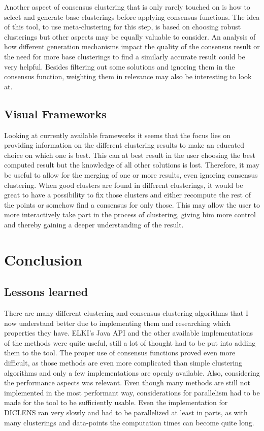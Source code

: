 \documentclass[
	a4paper,
	english,
	twoside,
	openright,               
	11pt                            
	]{report}
\begin{document}
Another aspect of consensus clustering that is only rarely touched on is how to select and generate base clusterings before applying consensus functions. The idea of this tool, to use meta-clustering for this step, is based on choosing robust clusterings but other aspects may be equally valuable to consider. An analysis of how different generation mechanisms impact the quality of the consensus result or the need for more base clusterings to find a similarly accurate result could be very helpful. Besides filtering out some solutions and ignoring them in the consensus function, weighting them in relevance may also be interesting to look at.

\section{Visual Frameworks}
Looking at currently available frameworks it seems that the focus lies on providing information on the different clustering results to make an educated choice on which one is best. This can at best result in the user choosing the best computed result but the knowledge of all other solutions is lost. Therefore, it may be useful to allow for the merging of one or more results, even ignoring consensus clustering. When good clusters are found in different clusterings, it would be great to have a possibility to fix those clusters and either recompute the rest of the points or somehow find a consensus for only those. This may allow the user to more interactively take part in the process of clustering, giving him more control and thereby gaining a deeper understanding of the result.

\chapter{Conclusion}\label{cha:conclusion}

\section{Lessons learned}
There are many different clustering and consensus clustering algorithms that I now understand better due to implementing them and researching which properties they have. ELKI's \cite{10.14778/2824032.2824115} Java API and the other available implementations of the methods were quite useful, still a lot of thought had to be put into adding them to the tool. The proper use of consensus functions proved even more difficult, as those methods are even more complicated than simple clustering algorithms and only a few implementations are openly available. Also, considering the performance aspects was relevant. Even though many methods are still not implemented in the most performant way, considerations for parallelism had to be made for the tool to be sufficiently usable. Even the implementation for DICLENS \cite{6035671} ran very slowly and had to be parallelized at least in parts, as with many clusterings and data-points the computation times can become quite long.
\end{document}
